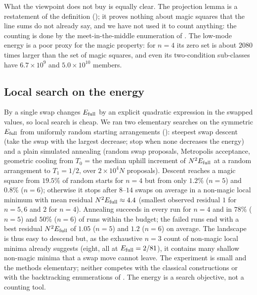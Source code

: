 What the viewpoint does not buy is equally clear.
The projection lemma is a restatement of the definition (); it proves nothing about magic squares that the line sums do not already say, and we have not used it to count anything: the counting is done by the meet-in-the-middle enumeration of .
The low-mode energy is a poor proxy for the magic property: for $n=4$ its zero set is about $2080$ times larger than the set of magic squares, and even its two-condition sub-classes have $6.7\times10^9$ and $5.0\times10^{10}$ members.

\subsection{Local search on the energy}
\label{sec:algorithms}

By  a single swap changes $E_{\mathrm{full}}$ by an explicit quadratic expression in the swapped values, so local search is cheap.
We ran two elementary searches on the symmetric $E_{\mathrm{full}}$ from uniformly random starting arrangements (): steepest swap descent (take the swap with the largest decrease; stop when none decreases the energy) and a plain simulated annealing (random swap proposals, Metropolis acceptance, geometric cooling from $T_0$ = the median uphill increment of $N^2E_{\mathrm{full}}$ at a random arrangement to $T_1=1/2$, over $2\times10^4N$ proposals).
Descent reaches a magic square from $19.5\%$ of random starts for $n=4$ but from only $1.2\%$ ($n=5$) and $0.8\%$ ($n=6$); otherwise it stops after $8$--$14$ swaps on average in a non-magic local minimum with mean residual $N^2E_{\mathrm{full}}\approx4.4$ (smallest observed residual $1$ for $n=5,6$ and $2$ for $n=4$).
Annealing succeeds in every run for $n=4$ and in $78\%$ ($n=5$) and $50\%$ ($n=6$) of runs within the budget; the failed runs end with a best residual $N^2E_{\mathrm{full}}$ of $1.05$ ($n=5$) and $1.2$ ($n=6$) on average.
The landscape is thus easy to descend but, as the exhaustive $n=3$ count of non-magic local minima already suggests (eight, all at $E_{\mathrm{full}}=2/81$), it contains many shallow non-magic minima that a swap move cannot leave.
The experiment is small and the methods elementary; neither competes with the classical constructions or with the backtracking enumerations of \cite{beck2010enumeration,trump2012enumeration}. The energy is a search objective, not a counting tool.

